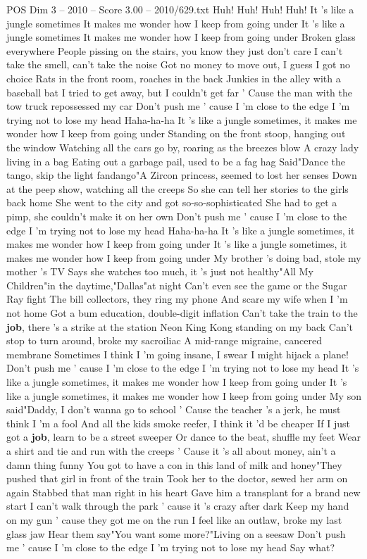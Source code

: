 \begin{textsample}{POS Dim 3 – 2010 – Score 3.00 – 2010/629.txt}  \label{ex:f3_pos_023}
Huh!
Huh!
Huh!
Huh!
It 's like a jungle sometimes It makes me wonder how I keep from going under It 's like a jungle sometimes It makes me wonder how I keep from going under Broken glass everywhere People pissing on the stairs, you know they just don't care I can't take the smell, can't take the noise Got no money to move out, I guess I got no choice Rats in the front room, roaches in the back Junkies in the alley with a baseball bat I tried to get away, but I couldn't get far ' Cause the man with the tow truck repossessed my car Don't push me ' cause I 'm close to the edge I 'm trying not to lose my head Haha-ha-ha It 's like a jungle sometimes, it makes me wonder how I keep from going under Standing on the front stoop, hanging out the window Watching all the cars go by, roaring as the breezes blow A crazy lady living in a bag Eating out a garbage pail, used to be a fag hag Said"Dance the tango, skip the light fandango"A Zircon princess, seemed to lost her senses Down at the peep show, watching all the creeps So she can tell her stories to the girls back home She went to the city and got so-so-sophisticated She had to get a pimp, she couldn't make it on her own Don't push me ' cause I 'm close to the edge I 'm trying not to lose my head Haha-ha-ha It 's like a jungle sometimes, it makes me wonder how I keep from going under It 's like a jungle sometimes, it makes me wonder how I keep from going under My brother 's doing bad, stole my mother 's TV Says she watches too much, it 's just not healthy"All My Children"in the daytime,"Dallas"at night Can't even see the game or the Sugar Ray fight The bill collectors, they ring my phone And scare my wife when I 'm not home Got a bum education, double-digit inflation Can't take the train to the \textbf{job}, there 's a strike at the station Neon King Kong standing on my back Can't stop to turn around, broke my sacroiliac A mid-range migraine, cancered membrane Sometimes I think I 'm going insane, I swear I might hijack a plane!
Don't push me ' cause I 'm close to the edge I 'm trying not to lose my head It 's like a jungle sometimes, it makes me wonder how I keep from going under It 's like a jungle sometimes, it makes me wonder how I keep from going under My son said"Daddy, I don't wanna go to school ' Cause the teacher 's a jerk, he must think I 'm a fool And all the kids smoke reefer, I think it 'd be cheaper If I just got a \textbf{job}, learn to be a street sweeper Or dance to the beat, shuffle my feet Wear a shirt and tie and run with the creeps ' Cause it 's all about money, ain't a damn thing funny You got to have a con in this land of milk and honey"They pushed that girl in front of the train Took her to the doctor, sewed her arm on again Stabbed that man right in his heart Gave him a transplant for a brand new start I can't walk through the park ' cause it 's crazy after dark Keep my hand on my gun ' cause they got me on the run I feel like an outlaw, broke my last glass jaw Hear them say"You want some more?"Living on a seesaw Don't push me ' cause I 'm close to the edge I 'm trying not to lose my head Say what?

\end{textsample}

